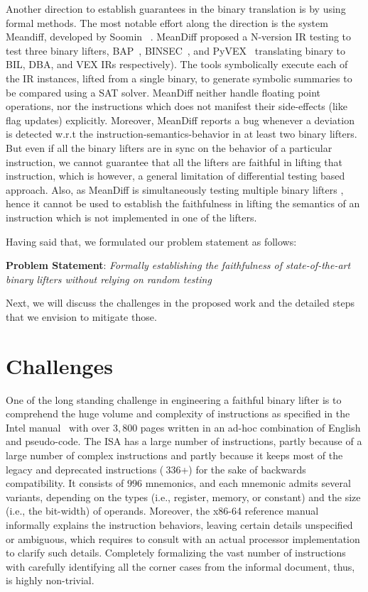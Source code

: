 Another direction to establish guarantees in the binary translation is by using formal methods. The most notable effort along the direction is the system  Meandiff, developed by Soomin \etal~\cite{ASE2017}.
%
MeanDiff proposed a N-version IR testing to test three binary lifters, BAP~\cite{BAP:CAV11}, BINSEC~\cite{BINSEC2011}, and PyVEX~\cite{PYVEX} translating binary to BIL, DBA, and VEX IRs respectively). The tools symbolically execute each of the IR instances, lifted from a single binary, to generate symbolic summaries to be compared using a SAT solver. MeanDiff neither handle floating point operations, nor the instructions which does not manifest their side-effects (like flag updates) explicitly. Moreover, MeanDiff reports a bug whenever a deviation is detected w.r.t the instruction-semantics-behavior in at least two binary lifters. But even if all the binary lifters are in sync on the behavior of a particular instruction, we cannot guarantee that all the lifters are faithful in lifting that instruction, which is however, a general limitation of differential testing based approach. Also, as MeanDiff is simultaneously testing multiple binary lifters , hence it cannot be used to establish the faithfulness in lifting the semantics of an instruction which is not implemented in one of the lifters. 

Having said that, we formulated our problem statement as follows:

\vspace{10pt}

\noindent\textbf{Problem Statement}: \emph{Formally establishing the
  faithfulness of state-of-the-art binary lifters without relying on random
    testing}

Next, we will discuss the challenges in the proposed work and the detailed
steps that we envision to mitigate those.

\section{Challenges}\label{sec:approach}

One of the long standing challenge in engineering a faithful binary lifter is
to comprehend the huge volume and complexity of instructions as specified in
the Intel manual~\cite{IntelManual} with over $3,800$ pages written in an
ad-hoc combination of English and pseudo-code. The \ISA ISA has a large number
of instructions, partly because of a large number of complex instructions and
partly because it keeps most of the legacy and deprecated instructions
($~336$+) for the sake of backwards compatibility. It consists of $996$
mnemonics, and each mnemonic admits several variants, depending on the types
(i.e., register, memory, or constant) and the size (i.e., the bit-width) of
operands. Moreover, the x86-64 reference manual informally explains the
instruction behaviors, leaving certain details unspecified or ambiguous, which
requires  to consult with an actual processor implementation to clarify such
details. Completely formalizing the vast number of instructions with carefully
identifying all the corner cases from the informal document, thus, is highly
non-trivial.
